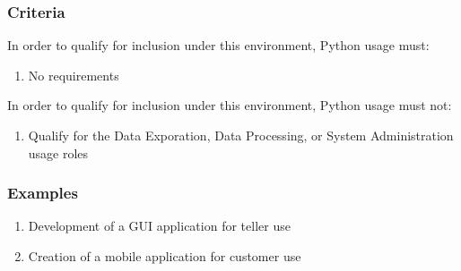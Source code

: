 		\subsubsection{Criteria}

			In order to qualify for inclusion under this environment, Python usage must:

			\begin{enumerate}
        		\item No requirements
        	\end{enumerate}

			In order to qualify for inclusion under this environment, Python usage must not:

			\begin{enumerate}
        		\item Qualify for the Data Exporation, Data Processing, or System Administration usage roles 
        	\end{enumerate}

		\subsubsection{Examples}

            \begin{enumerate}
                \item Development of a GUI application for teller use
                \item Creation of a mobile application for customer use
            \end{enumerate}
